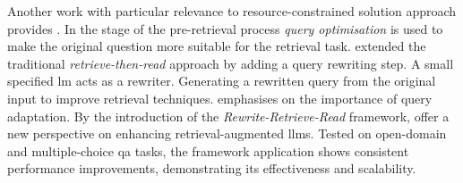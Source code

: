 %
Another work with particular relevance to resource-constrained solution approach provides \citet{Ma2023QueryRF}.
In the stage of the pre-retrieval process \textit{query optimisation} is used to make the original question more suitable for the retrieval task.
\citet{Ma2023QueryRF} extended the traditional \textit{retrieve-then-read} approach by adding a query rewriting step.
A small specified \ac{lm} acts as a rewriter.
Generating a rewritten query from the original input to improve retrieval techniques. 
\citet{Ma2023QueryRF} emphasises on the importance of query adaptation.
By the introduction of the \textit{Rewrite-Retrieve-Read} framework, \citet{Ma2023QueryRF} offer a new perspective on enhancing retrieval-augmented \acp{llm}.
Tested on open-domain and multiple-choice \ac{qa} tasks, the framework application shows consistent performance improvements, demonstrating its effectiveness and scalability.
%
